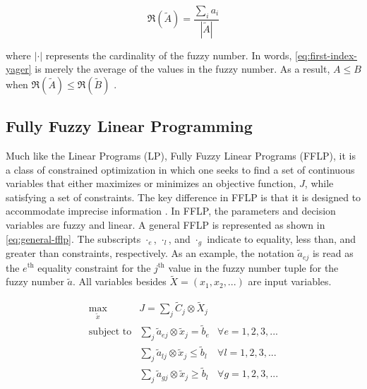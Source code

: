 \documentclass[ee,msthesis]{usuthesis}
\begin{document}
\begin{equation}
\label{eq:first-index-yager}
\mathfrak{R}(\tilde{A}) = \frac{\sum_i a_i}{|\tilde{A}|}
\end{equation}

\noindent where \(|\cdot|\) represents the cardinality of the fuzzy number. In words, \ref{eq:first-index-yager} is merely the
average of the values in the fuzzy number. As a result, \(A \le B\) when \(\mathfrak{R}(\tilde{A}) \le \mathfrak{R}(\tilde{B})\)
\cite{bello-2019-fuzzy-activ}.

\subsection{Fully Fuzzy Linear Programming}
\label{sec:fully-fuzzy-linear-programming}
Much like the Linear Programs (LP), Fully Fuzzy Linear Programs (FFLP), it is a class of constrained optimization in
which one seeks to find a set of continuous variables that either maximizes or minimizes an objective function, \(J\),
while satisfying a set of constraints. The key difference in FFLP is that it is designed to accommodate imprecise
information \cite{bello-2019-fuzzy-activ,kaur-2016-introd-fuzzy}. In FFLP, the parameters and decision variables are
fuzzy and linear. A general FFLP is represented as shown in \ref{eq:general-fflp}. The subscripts \(\cdot_e\), \(\cdot_l\), and \(\cdot_g\)
indicate to equality, less than, and greater than constraints, respectively. As an example, the notation
\(\tilde{a}_{ej}\) is read as the \(e^{\text{th}}\) equality constraint for the \(j^{\text{th}}\) value in the fuzzy number
tuple for the fuzzy number \(\tilde{a}\). All variables besides \(\tilde{X} = (x_1, x_2, ...)\) are input variables.

\begin{equation}
\label{eq:general-fflp}
\begin{array}{lll}
\underset{{\tilde{x}}}{\text{max}} & J = \sum_j \tilde{C}_j \otimes \tilde{X}_j              &                 \\
\text{subject to}                  & \sum_j \tilde{a}_{ej} \otimes \tilde{x}_j = \tilde{b}_e &  \forall e = 1,2,3,... \\
                                   & \sum_j \tilde{a}_{lj} \otimes \tilde{x}_j \le \tilde{b}_l &  \forall l = 1,2,3,... \\
                                   & \sum_j \tilde{a}_{gj} \otimes \tilde{x}_j \ge \tilde{b}_l &  \forall g = 1,2,3,...
\end{array}
\end{equation}
\end{document}
